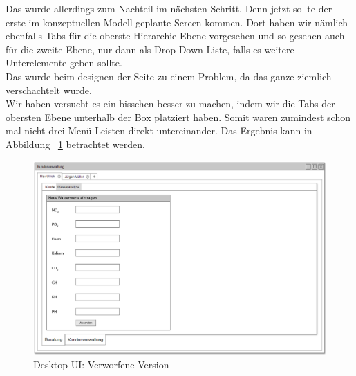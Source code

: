 Das wurde allerdings zum Nachteil im nächsten Schritt. Denn jetzt sollte der erste im konzeptuellen Modell geplante Screen kommen. Dort haben wir nämlich ebenfalls Tabs für die oberste Hierarchie-Ebene vorgesehen und so gesehen auch für die zweite Ebene, nur dann als Drop-Down Liste, falls es weitere Unterelemente geben sollte.\\
Das wurde beim designen der Seite zu einem Problem, da das ganze ziemlich verschachtelt wurde. \\
Wir haben versucht es ein bisschen besser zu machen, indem wir die Tabs der obersten Ebene unterhalb der Box platziert haben. Somit waren zumindest schon mal nicht drei Menü-Leisten direkt untereinander. Das Ergebnis kann in Abbildung 
~\ref{desktopUI:0} betrachtet werden.

\begin{figure}[ht!]
\centering
\includegraphics[width=\linewidth]{0Version1}
\caption{Desktop UI: Verworfene Version}
\label{desktopUI:0}
\end{figure}

